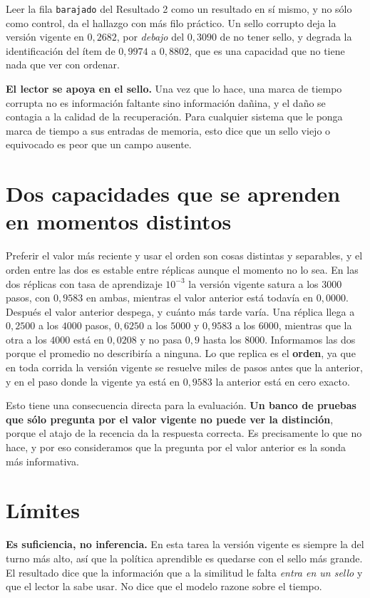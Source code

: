 \documentclass[11pt,a4paper]{article}
\begin{document}
Leer la fila \texttt{barajado} del Resultado 2 como un resultado en sí mismo, y no sólo como control,
da el hallazgo con más filo práctico. Un sello corrupto deja la versión vigente en $0{,}2682$, por
\emph{debajo} del $0{,}3090$ de no tener sello, y degrada la identificación del ítem de $0{,}9974$ a
$0{,}8802$, que es una capacidad que no tiene nada que ver con ordenar.

\textbf{El lector se apoya en el sello.} Una vez que lo hace, una marca de tiempo corrupta no es
información faltante sino información dañina, y el daño se contagia a la calidad de la recuperación.
Para cualquier sistema que le ponga marca de tiempo a sus entradas de memoria, esto dice que un sello
viejo o equivocado es peor que un campo ausente.

\section{Dos capacidades que se aprenden en momentos distintos}

Preferir el valor más reciente y usar el orden son cosas distintas y separables, y el orden entre las
dos es estable entre réplicas aunque el momento no lo sea. En las dos réplicas con tasa de aprendizaje
$10^{-3}$ la versión vigente satura a los $3000$ pasos, con $0{,}9583$ en ambas, mientras el valor
anterior está todavía en $0{,}0000$. Después el valor anterior despega, y cuánto más tarde varía. Una
réplica llega a $0{,}2500$ a los $4000$ pasos, $0{,}6250$ a los $5000$ y $0{,}9583$ a los $6000$,
mientras que la otra a los $4000$ está en $0{,}0208$ y no pasa $0{,}9$ hasta los $8000$. Informamos las
dos porque el promedio no describiría a ninguna. Lo que replica es el \textbf{orden}, ya que en toda
corrida la versión vigente se resuelve miles de pasos antes que la anterior, y en el paso donde la
vigente ya está en $0{,}9583$ la anterior está en cero exacto.

Esto tiene una consecuencia directa para la evaluación. \textbf{Un banco de pruebas que sólo pregunta
por el valor vigente no puede ver la distinción}, porque el atajo de la recencia da la respuesta
correcta. Es precisamente lo que \citet{unabletoforget} no hace, y por eso consideramos que la pregunta
por el valor anterior es la sonda más informativa.

\section{Límites}

\textbf{Es suficiencia, no inferencia.} En esta tarea la versión vigente es siempre la del turno más
alto, así que la política aprendible es quedarse con el sello más grande. El resultado dice que la
información que a la similitud le falta \emph{entra en un sello} y que el lector la sabe usar. No dice
que el modelo razone sobre el tiempo.
\end{document}
